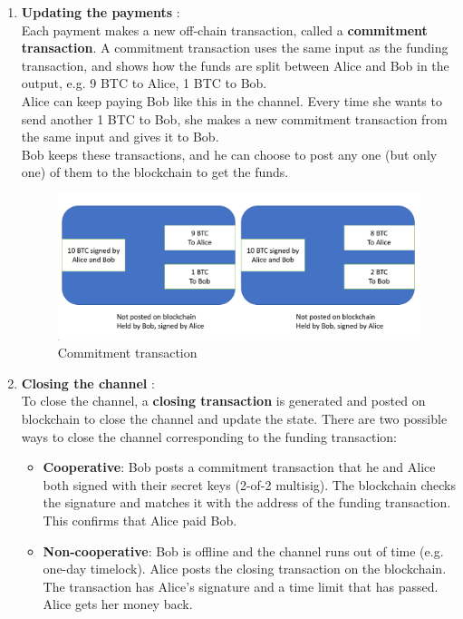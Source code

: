 \begin{enumerate}
	\item \textbf{Updating the payments} :\\
	Each payment makes a new off-chain transaction, called a \textbf{commitment transaction}. A commitment transaction uses the same input as the funding transaction, and shows how the funds are split between Alice and Bob in the output, e.g. 9 BTC to Alice, 1 BTC to Bob.\\
	Alice can keep paying Bob like this in the channel. Every time she wants to send another 1 BTC to Bob, she makes a new commitment transaction from the same input and gives it to Bob. \\
	Bob keeps these transactions, and he can choose to post any one (but only one) of them to the blockchain to get the funds.
	\begin{figure}[h!]
		\centering
		\includegraphics[width=0.6\linewidth]{Fig/13/F3}
		\caption{Commitment transaction}
		\label{fig:L13_f3}
	\end{figure}
	
	\item \textbf{Closing the channel} :\\
	To close the channel, a \textbf{closing transaction} is generated and posted on	blockchain to close the channel and update the state. There are two possible ways to close the	channel corresponding to the funding transaction:
	\begin{itemize}
		\item \textbf{Cooperative}: Bob posts a commitment transaction that he and Alice both signed with their secret keys (2-of-2 multisig). The blockchain checks the signature and matches it with the address of the funding transaction. This confirms that Alice paid Bob.
		\item \textbf{Non-cooperative}: Bob is offline and the channel runs out of time (e.g. one-day timelock). Alice posts the closing transaction on the blockchain. The transaction has Alice’s signature and a time limit that has passed. Alice gets her money back.
	\end{itemize}
\end{enumerate}

